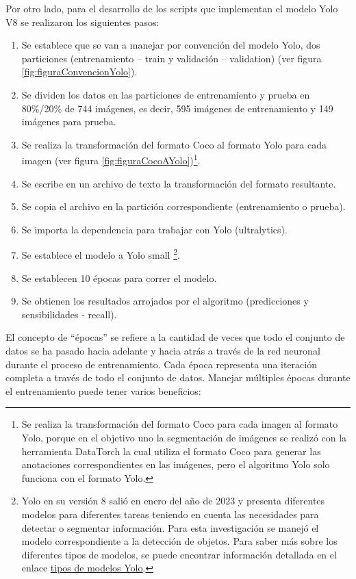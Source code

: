 \newpage

Por otro lado, para el desarrollo de los scripts que implementan el modelo Yolo V8 se realizaron los siguientes pasos:

\begin{enumerate}
    \item Se establece que se van a manejar por convención del modelo Yolo, dos particiones (entrenamiento – train y validación – validation) (ver figura \ref{fig:figuraConvencionYolo}).
    \item Se dividen los datos en las particiones de entrenamiento y prueba en 80\%/20\% de 744 imágenes, es decir, 595 imágenes de entrenamiento y 149 imágenes para prueba.
    \item Se realiza la transformación del formato Coco al formato Yolo para cada imagen  (ver figura \ref{fig:figuraCocoAYolo})\footnote{Se realiza la transformación del formato Coco para cada imagen al formato Yolo, porque en el objetivo uno la segmentación de imágenes se realizó con la herramienta DataTorch la cual utiliza el formato Coco para generar las anotaciones correspondientes en las imágenes, pero el algoritmo Yolo solo funciona con el formato Yolo.}.
    \item Se escribe en un archivo de texto la transformación del formato resultante.
    \item Se copia el archivo en la partición correspondiente (entrenamiento o prueba).
    \item Se importa la dependencia para trabajar con Yolo (ultralytics).
    \item Se establece el modelo a Yolo small \footnote{Yolo en su versión 8 salió en enero del año de 2023 y presenta diferentes modelos para diferentes tareas teniendo en cuenta las necesidades para detectar o segmentar información. Para esta investigación se manejó el modelo correspondiente a la detección de objetos. Para saber más sobre los diferentes tipos de modelos, se puede encontrar información detallada en el enlace \href{https://docs.ultralytics.com/es/models/yolov8/\#tareas-y-modos-compatibles}{tipos de modelos Yolo}. }. 
    \item Se establecen 10 épocas para correr el modelo.
    \item Se obtienen los resultados arrojados por el algoritmo (predicciones y sensibilidades - recall).
\end{enumerate}

El concepto de ``épocas'' se refiere a la cantidad de veces que todo el conjunto de datos se ha pasado hacia adelante y hacia atrás a través de la red neuronal durante el proceso de entrenamiento. Cada época representa una iteración completa a través de todo el conjunto de datos.
Manejar múltiples épocas durante el entrenamiento puede tener varios beneficios:

